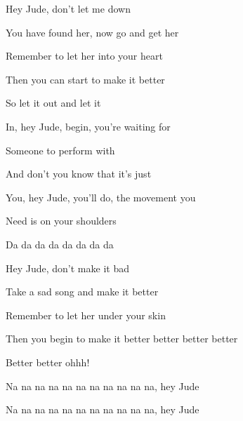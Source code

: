 \begin{song}
\bigskip

Hey Jude, don’t let me down \par
You have found her, now go and get her \par
Remember to let her into your heart \par
Then you can start to make it better \par

\bigskip

 So let it out and let it \par
{}In, hey Jude, begin, you're waiting for \par
{}Someone to perform with \par
{} And don’t you know that it's just \par
{}You, hey Jude, you'll do, the movement you \par
{}Need is on your shoulders \par

\bigskip

Da da da da da da da da \par

\bigskip

Hey Jude, don’t make it bad \par
Take a sad song and make it better \par
Remember to let her under your skin \par
Then you begin to make it better better better better \par
{}Better better ohhh! \par

\bigskip

Na na na na na na na na na na na, hey Jude \par
{}Na na na na na na na na na na na, hey Jude \par
{}


\end{song}
